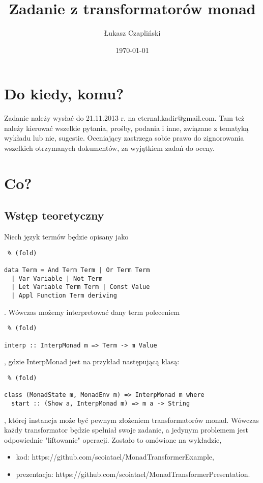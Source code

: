 \documentclass[11pt,wide]{mwart}
\title{Zadanie z transformatorów monad}
\author{Łukasz Czapliński}
\date{\today}
\begin{document}
\maketitle
\section{Do kiedy, komu?}
Zadanie należy wysłać do 21.11.2013 r. na eternal.kadir@gmail.com. Tam też należy kierować wszelkie pytania, prośby, podania i inne, związane z tematyką wykładu lub nie, sugestie. Oceniający zastrzega sobie prawo do zignorowania wszelkich otrzymanych dokumentów, za wyjątkiem zadań do oceny. 
\section{Co?}
\subsection{Wstęp teoretyczny}
Niech język termów będzie opisany jako \begin{lstlisting} % (fold)

data Term = And Term Term | Or Term Term 
  | Var Variable | Not Term 
  | Let Variable Term Term | Const Value
  | Appl Function Term deriving

\end{lstlisting}. Wówczas możemy interpretować dany term poleceniem \begin{lstlisting} % (fold)

interp :: InterpMonad m => Term -> m Value

\end{lstlisting}, gdzie InterpMonad jest na przykład następującą klasą: \begin{lstlisting} % (fold)

class (MonadState m, MonadEnv m) => InterpMonad m where
  start :: (Show a, InterpMonad m) => m a -> String

\end{lstlisting}, której instancja może być pewnym złożeniem transformatorów monad. Wówczas każdy transformator będzie spełniał swoje zadanie, a jedynym problemem jest odpowiednie "liftowanie" operacji. Zostało to omówione na wykładzie,\begin{itemize}
  \item kod: https://github.com/scoiatael/MonadTransformerExample,
  \item prezentacja: https://github.com/scoiatael/MonadTransformerPresentation.
\end{itemize}
\end{document}

